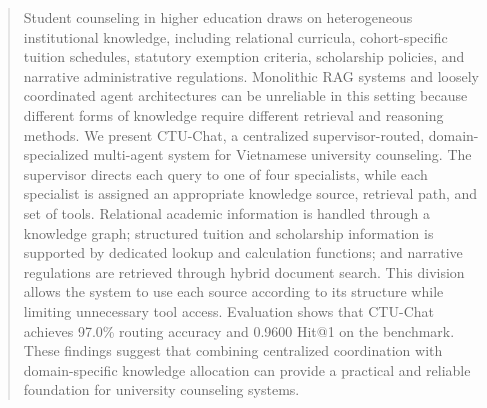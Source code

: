 \begin{abstract}
Student counseling in higher education draws on heterogeneous institutional knowledge, including relational curricula, cohort-specific tuition schedules, statutory exemption criteria, scholarship policies, and narrative administrative regulations. Monolithic RAG systems and loosely coordinated agent architectures can be unreliable in this setting because different forms of knowledge require different retrieval and reasoning methods. We present CTU-Chat, a centralized supervisor-routed, domain-specialized multi-agent system for Vietnamese university counseling. The supervisor directs each query to one of four specialists, while each specialist is assigned an appropriate knowledge source, retrieval path, and set of tools. Relational academic information is handled through a knowledge graph; structured tuition and scholarship information is supported by dedicated lookup and calculation functions; and narrative regulations are retrieved through hybrid document search. This division allows the system to use each source according to its structure while limiting unnecessary tool access. Evaluation shows that CTU-Chat achieves 97.0\% routing accuracy and 0.9600 Hit@1 on the benchmark. These findings suggest that combining centralized coordination with domain-specific knowledge allocation can provide a practical and reliable foundation for university counseling systems.

\end{abstract}
